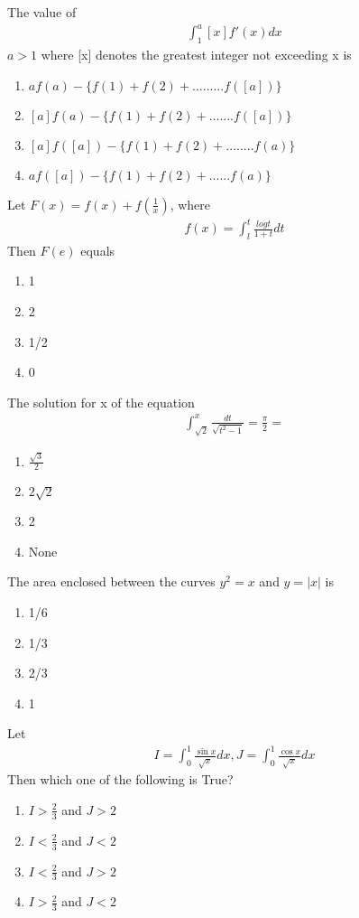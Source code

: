 \item The value of
\begin{align*}
\int_{1}^{a}[x]f'(x)dx
\end{align*}
$a > 1$ where [x] denotes the greatest integer not exceeding x is
\begin{enumerate}
\item $af(a) - \{f(1) + f(2) +.........f([a])\}$
\item $[a]f(a) - \{f(1) + f(2) +.......f([a])\}$
\item $[a]f([a]) - \{f(1) + f(2) +........f(a)\}$
\item $af([a]) - \{f(1) + f(2) + ......f(a)\}$
\end{enumerate}

\item Let $F(x) = f(x) + f(\frac{1}{x})$, where
\begin{align*}
f(x) = \int_{l}^{t}\frac{logt}{1 + t}dt
\end{align*}
Then $F(e)$ equals
\begin{enumerate}
\item 1
\item 2
\item 1/2
\item 0
\end{enumerate}

\item The solution for x of the equation
\begin{align*}
\int_{\sqrt{2}}^{x}\frac{dt}{\sqrt{t^2 - 1}} = \frac{\pi}{2} = 
\end{align*}
\begin{enumerate}
\item $\frac{\sqrt{3}}{2}$
\item $2\sqrt{2}$
\item 2
\item None
\end{enumerate}

\item The area enclosed between the curves $y^2 = x$ and $y = |x|$ is
\begin{enumerate}
\item 1/6
\item 1/3
\item 2/3
\item 1
\end{enumerate}

\item Let
\begin{align*}
I = \int_{0}^{1}\frac{\sin x}{\sqrt{x}}dx, J = \int_{0}^{1}\frac{\cos x}{\sqrt{x}}dx 
\end{align*}
Then which one of the following is True?
\begin{enumerate}
\item $I > \frac{2}{3}$ and $J > 2$
\item $I < \frac{2}{3}$ and $J < 2$
\item $I < \frac{2}{3}$ and $J > 2$
\item $I > \frac{2}{3}$ and $J < 2$
\end{enumerate}

